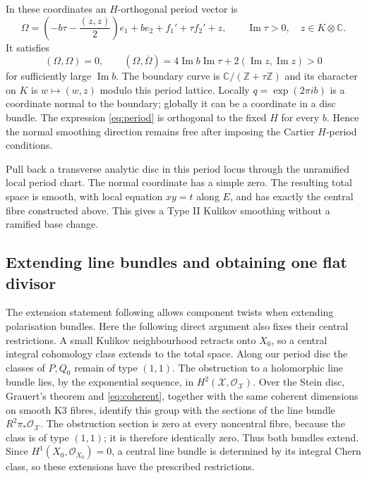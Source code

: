 \documentclass[11pt]{article}
\theoremstyle{definition}
\theoremstyle{remark}
\newcommand{\Z}{\mathbb Z}
\newcommand{\C}{\mathbb C}
\newcommand{\OO}{\mathcal O}
\begin{document}
In these coordinates an $H$-orthogonal period vector is
\begin{equation}\label{eq:period}
\Omega=\left(-b\tau-\frac{(z,z)}2\right)e_1+b e_2
+f_1'+\tau f_2'+z,
\qquad \operatorname{Im}\tau>0,\quad z\in K\otimes\C.
\end{equation}
It satisfies
\[
(\Omega,\Omega)=0,\qquad
(\Omega,\overline\Omega)=4\operatorname{Im}b\operatorname{Im}\tau
+2(\operatorname{Im}z,\operatorname{Im}z)>0
\]
for sufficiently large $\operatorname{Im}b$. The boundary curve is $\C/(\Z+\tau\Z)$ and its character on $K$ is $w\mapsto(w,z)$ modulo this period lattice. Locally $q=\exp(2\pi i b)$ is a coordinate normal to the boundary; globally it can be a coordinate in a disc bundle. The expression \eqref{eq:period} is orthogonal to the fixed $H$ for every $b$. Hence the normal smoothing direction remains free after imposing the Cartier $H$-period conditions.

Pull back a transverse analytic disc in this period locus through the unramified local period chart. The normal coordinate has a simple zero. The resulting total space is smooth, with local equation $xy=t$ along $E$, and has exactly the central fibre constructed above. This gives a Type II Kulikov smoothing without a ramified base change.

\subsection{Extending line bundles and obtaining one flat divisor}
The extension statement following \cite[Definition~7.26]{AE} allows component twists when extending polarisation bundles. Here the following direct argument also fixes their central restrictions. A small Kulikov neighbourhood retracts onto $X_0$, so a central integral cohomology class extends to the total space. Along our period disc the classes of $P,Q_0$ remain of type $(1,1)$. The obstruction to a holomorphic line bundle lies, by the exponential sequence, in $H^2(\mathcal X,\OO_{\mathcal X})$. Over the Stein disc, Grauert's theorem and \eqref{eq:coherent}, together with the same coherent dimensions on smooth K3 fibres, identify this group with the sections of the line bundle $R^2\pi_*\OO_{\mathcal X}$. The obstruction section is zero at every noncentral fibre, because the class is of type $(1,1)$; it is therefore identically zero. Thus both bundles extend. Since $H^1(X_0,\OO_{X_0})=0$, a central line bundle is determined by its integral Chern class, so these extensions have the prescribed restrictions.
\end{document}
